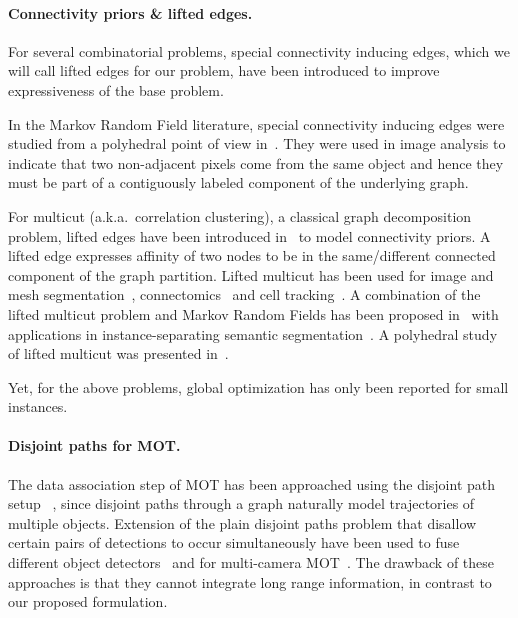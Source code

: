 \documentclass{article}
\begin{document}
\paragraph{Connectivity priors \& lifted edges.}
For several combinatorial problems, special connectivity inducing edges, which we will call lifted edges for our problem, have been introduced to improve expressiveness of the  base problem.

In the Markov Random Field literature, special connectivity inducing edges were studied from a polyhedral point of view in~\cite{nowozin2010global}.
They were used in image analysis to indicate that two non-adjacent pixels come from the same object and hence they must be part of a contiguously labeled component of the underlying graph.

For multicut (a.k.a.\ correlation clustering), a classical graph decomposition problem, lifted edges have been introduced in~\cite{keuper2015lifted} to model connectivity priors. 
A lifted edge expresses affinity of two nodes to be in the same/different connected component of the graph partition.
Lifted multicut has been used for image and mesh segmentation~\cite{keuper2015lifted}, connectomics~\cite{beier2017multicut} and cell tracking~\cite{rempfler2017efficient}.
A combination of the lifted multicut problem and Markov Random Fields has been proposed in~\cite{levinkov2017joint} with applications in instance-separating semantic segmentation~\cite{kirillov2017instancecut}.
A polyhedral study of lifted multicut was presented in~\cite{hornakova2017analysis}.

Yet, for the above problems, global optimization  has only been reported for small instances.

\paragraph{Disjoint paths for MOT.}
The data association step of MOT has been approached using the disjoint path setup ~\cite{berclaz2011multiple,zhang2008global}, since disjoint paths through a graph naturally model trajectories of multiple objects. 
Extension of the plain disjoint paths problem that disallow certain pairs of detections to occur simultaneously have been used to fuse different object detectors~\cite{chari2015pairwise} and for multi-camera MOT~\cite{hofmann2013hypergraphs,leal2012branch}. 
The drawback of these approaches is that they cannot integrate long range information, in contrast to our proposed formulation.
\end{document}
